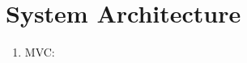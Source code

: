 \documentclass[12pt]{article}%
\begin{document}
\begin{enumerate}[4.a.]
    
    
\end{enumerate}

\clearpage
\section{System Architecture}
\begin{enumerate}[5.a.]
	\item MVC: 
	
	
		
	
	
	

\end{enumerate}
\end{document}
